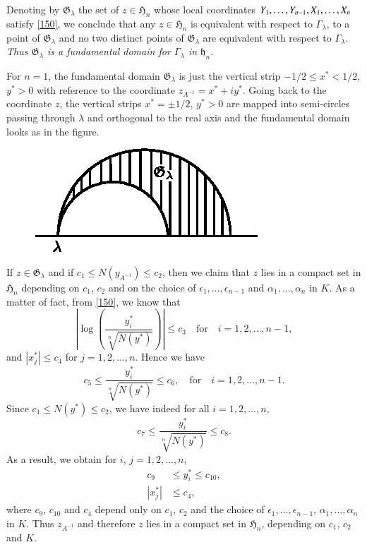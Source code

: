 Denoting by $\mathfrak{G}_{\lambda}$ the set of $z\in\mathfrak{H}_{n}$
whose local coordinates $Y_{1},\ldots,\break Y_{n-1},X_{1},\ldots,X_{n}$
satisfy \eqref{150}, we conclude that any $z\in\mathfrak{H}_{n}$ is
equivalent with respect to $\Gamma_{\lambda}$, to a point of
$\mathfrak{G}_{\lambda}$ and no two distinct points of
$\mathfrak{G}_{\lambda}$ are equivalent with respect to
$\Gamma_{\lambda}$. {\em Thus $\mathfrak{G}_{\lambda}$ is a
  fundamental domain for $\Gamma_{\lambda}$ in $\mathfrak{h}_{n}$.}

For $n=1$, the fundamental domain $\mathfrak{G}_{\lambda}$ is just the
vertical strip $-1/2\leq x^{\ast}<1/2$, $y^{\ast}>0$ with reference to
the coordinate $z_{A^{-1}}=x^{\ast}+iy^{\ast}$. Going back to the
coordinate $z$, the vertical strips $x^{\ast}=\pm 1/2$, $y^{\ast}>0$
are mapped into semi-circles passing through $\lambda$ and orthogonal
to the real axis and the fundamental domain looks as in the figure.

\begin{figure}[H]
\centering
\includegraphics{figure1.eps}
\end{figure}

If $z\in\mathfrak{G}_{\lambda}$ and if $c_{1}\leq N(y_{A^{-1}})\leq
c_{2}$, then we claim that $z$ lies in a compact set in
$\mathfrak{H}_{n}$ depending on $c_{1}$, $c_{2}$ and on the choice of
$\epsilon_{1},\ldots,\epsilon_{n-1}$ and
$\alpha_{1},\ldots,\alpha_{n}$ in $K$. As a matter of fact, from
\eqref{150}, we know that
$$
\left|\log\left(\frac{y^{\ast}_{i}}{\sqrt[n]{N(y^{\ast})}}\right)\right|\leq
c_{3}\quad\text{for}\quad i=1,2,\ldots,n-1,
$$
and $|x^{\ast}_{j}|\leq c_{4}$ for $j=1,2,\ldots,n$. Hence we have
$$
c_{5}\leq \frac{y^{\ast}_{i}}{\sqrt[n]{N(y^{\ast})}}\leq
c_{6},\quad\text{for}\quad i=1,2,\ldots,n-1.
$$\pageoriginale
Since $c_{1}\leq N(y^{\ast})\leq c_{2}$, we have indeed for all
$i=1,2,\ldots,n$, 
$$
c_{7}\leq \frac{y^{\ast}_{i}}{\sqrt[n]{N(y^{\ast})}}\leq c_{8}.
$$
As a result, we obtain for $i$, $j=1,2,\ldots,n$,
\begin{align*}
c_{9} & \leq y^{\ast}_{i}\leq c_{10},\\
|x^{\ast}_{j}| & \leq c_{4},
\end{align*}
where $c_{9}$, $c_{10}$ and $c_{4}$ depend only on $c_{1}$, $c_{2}$
and the choice of $\epsilon_{1},\ldots,\epsilon_{n-1}$,
$\alpha_{1},\ldots,\alpha_{n}$ in $K$. Thus $z_{A^{-1}}$ and therefore
$z$ lies in a compact set in $\mathfrak{H}_{n}$, depending on $c_{1}$,
$c_{2}$ and $K$.

